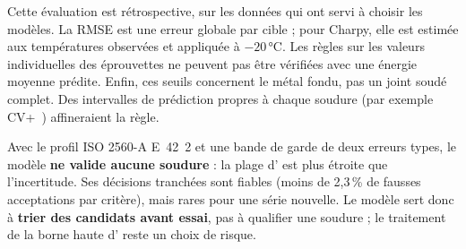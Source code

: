 \begin{precaution}
Cette évaluation est rétrospective, sur les données qui ont servi à choisir les
modèles. La RMSE est une erreur globale par cible ; pour Charpy, elle est
estimée aux températures observées et appliquée à $-20$\,°C. Les règles sur les
valeurs individuelles des éprouvettes ne peuvent pas être vérifiées avec une
énergie moyenne prédite. Enfin, ces seuils concernent le métal fondu, pas un
joint soudé complet. Des intervalles de prédiction propres à chaque soudure
(par exemple CV+~\cite{barber_2021}) affineraient la règle.
\end{precaution}

\begin{aretenir}
Avec le profil ISO 2560-A E~42~2 et une bande de garde de deux erreurs types,
le modèle \textbf{ne valide aucune soudure} : la plage d'\UTS{} est plus étroite
que l'incertitude. Ses décisions tranchées sont fiables (moins de 2,3\,\% de
fausses acceptations par critère), mais rares pour une série nouvelle. Le modèle
sert donc à \textbf{trier des candidats avant essai}, pas à qualifier une
soudure ; le traitement de la borne haute d'\UTS{} reste un choix de risque.
\end{aretenir}
